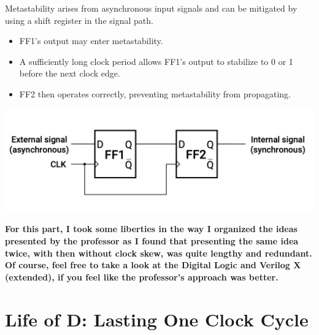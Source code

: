 \documentclass[12pt,openany]{book}
\begin{document}
\begin{minipage}{0.4\textwidth}
    Metastability arises from asynchronous input signals and can be mitigated by using a shift register in the signal path.
    \begin{itemize}
        \item[] FF1's output may enter metastability.
        \item[] A sufficiently long clock period allows FF1's output to stabilize to 0 or 1 before the next clock edge.
        \item[] FF2 then operates correctly, preventing metastability from propagating.
    \end{itemize}
\end{minipage}
\hfill
\vline
\hfill
\begin{minipage}{0.4\textwidth}
	\hspace*{-40px}
	\includegraphics[width=1.6\textwidth]{circuits/15.3.png}
	\hspace*{20px}
\end{minipage}
\newpage
\textbf{For this part, I took some liberties in the way I organized the ideas presented by the professor as I found that presenting the same idea twice, with then without clock skew, was quite lengthy and redundant. Of course, feel free to take a look at the Digital Logic and Verilog X (extended), if you feel like the professor's approach was better. }
\section{Life of D: Lasting One Clock Cycle}
\end{document}
